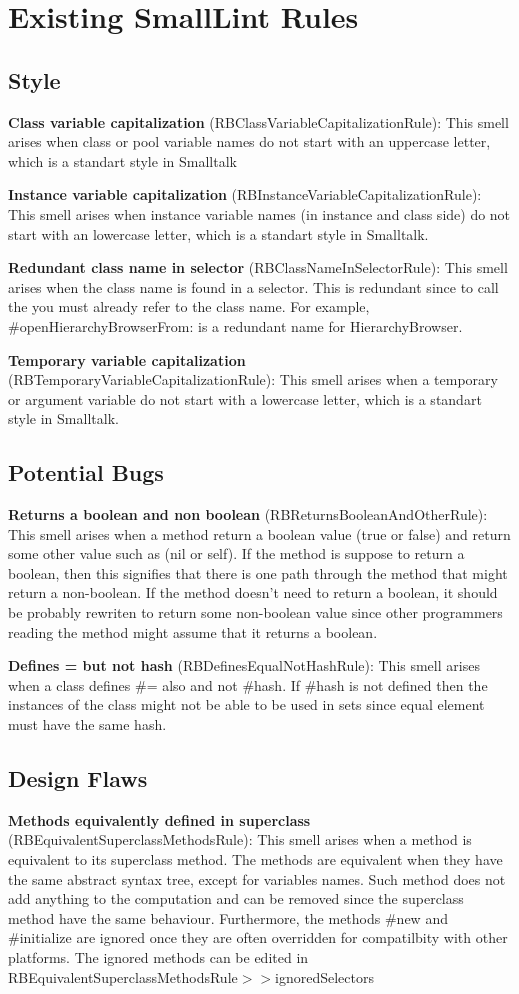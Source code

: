 \section{Existing SmallLint Rules}
\subsection{Style}
\textbf{Class variable capitalization} (RBClassVariableCapitalizationRule): This smell arises when class or pool variable names do not start with an uppercase letter, which is a standart style in Smalltalk

\textbf{Instance variable capitalization} (RBInstanceVariableCapitalizationRule): This smell arises when instance variable names (in instance and class side) do not start with an lowercase letter, which is a standart style in Smalltalk.

\textbf{Redundant class name in selector} (RBClassNameInSelectorRule): This smell arises when the class name is found in a selector. This is redundant since to call the you must already refer to the class name. For example, \#openHierarchyBrowserFrom: is a redundant name for HierarchyBrowser.

\textbf{Temporary variable capitalization} (RBTemporaryVariableCapitalizationRule): This smell arises when a temporary or argument variable do not start with a lowercase letter, which is a standart style in Smalltalk.

\subsection{Potential Bugs}
\textbf{Returns a boolean and non boolean} (RBReturnsBooleanAndOtherRule): This smell arises when a method return a boolean value (true or false) and return some other value such as (nil or self). If the method is suppose to return a boolean, then this signifies that there is one path through the method that might return a non-boolean. If the method doesn't need to return a boolean, it should be probably rewriten to return some non-boolean value since other programmers reading the method might assume that it returns a boolean.

\textbf{Defines = but not hash} (RBDefinesEqualNotHashRule): This smell arises when a class defines \#= also and not \#hash. If \#hash is not defined then the instances of the class might not be able to be used in sets since equal element must have the same hash.

\subsection{Design Flaws}
\textbf{Methods equivalently defined in superclass} (RBEquivalentSuperclassMethodsRule): This smell arises when a method is equivalent to its superclass method. The methods are equivalent when they have the same abstract syntax tree, except for variables names. Such method does not add anything to the computation and can be removed since the superclass method have the same behaviour. Furthermore, the methods \#new and \#initialize are ignored once they are often overridden for compatilbity with other platforms. The ignored methods can be edited in RBEquivalentSuperclassMethodsRule$>>$ignoredSelectors

